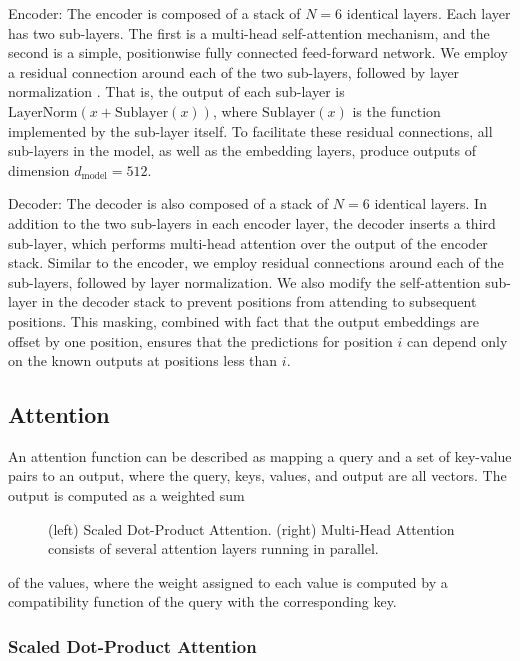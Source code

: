 \documentclass[12pt, a4paper]{article}
\begin{document}
Encoder: The encoder is composed of a stack of $N = 6$ identical layers. Each layer has two sub-layers. The first is a multi-head self-attention mechanism, and the second is a simple, positionwise fully connected feed-forward network. We employ a residual connection \cite{11} around each of the two sub-layers, followed by layer normalization \cite{1}. That is, the output of each sub-layer is $\text{LayerNorm}( x + \text{Sublayer}( x ))$, where $\text{Sublayer}( x )$ is the function implemented by the sub-layer itself. To facilitate these residual connections, all sub-layers in the model, as well as the embedding layers, produce outputs of dimension $d_{\text{model}} = 512$.

Decoder: The decoder is also composed of a stack of $N = 6$ identical layers. In addition to the two sub-layers in each encoder layer, the decoder inserts a third sub-layer, which performs multi-head attention over the output of the encoder stack. Similar to the encoder, we employ residual connections around each of the sub-layers, followed by layer normalization. We also modify the self-attention sub-layer in the decoder stack to prevent positions from attending to subsequent positions. This masking, combined with fact that the output embeddings are offset by one position, ensures that the predictions for position $i$ can depend only on the known outputs at positions less than $i$.

\subsection{Attention}

An attention function can be described as mapping a query and a set of key-value pairs to an output, where the query, keys, values, and output are all vectors. The output is computed as a weighted sum

\begin{figure}[H]
\centering
\caption{(left) Scaled Dot-Product Attention. (right) Multi-Head Attention consists of several attention layers running in parallel.}
\label{fig:attention_types}
\end{figure}

of the values, where the weight assigned to each value is computed by a compatibility function of the query with the corresponding key.

\subsubsection{Scaled Dot-Product Attention}
\end{document}
